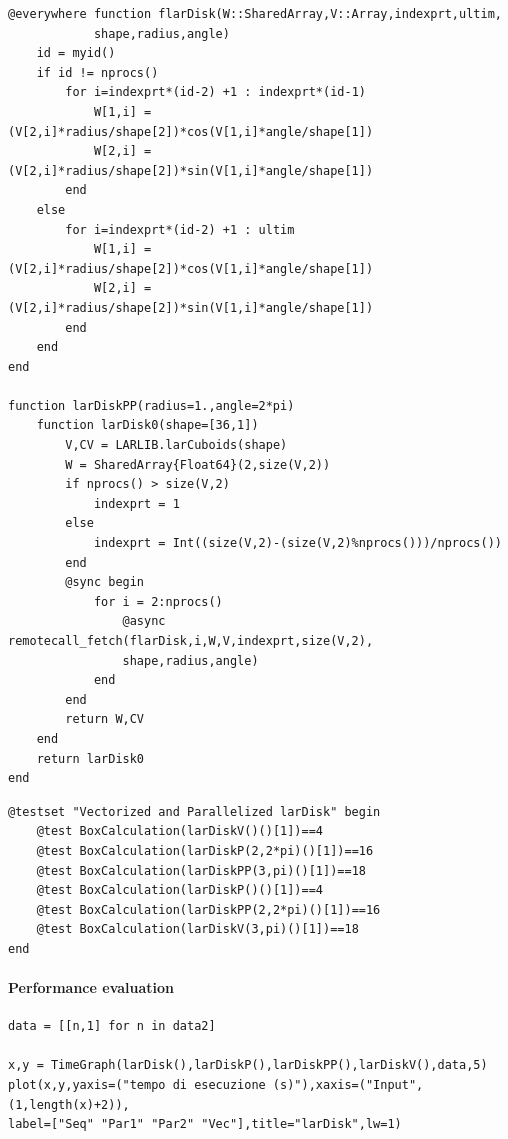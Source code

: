 \documentclass{article}
\begin{document}
\begin{Verbatim}
@everywhere function flarDisk(W::SharedArray,V::Array,indexprt,ultim,
            shape,radius,angle)
    id = myid()
    if id != nprocs()
        for i=indexprt*(id-2) +1 : indexprt*(id-1)
            W[1,i] = (V[2,i]*radius/shape[2])*cos(V[1,i]*angle/shape[1])
            W[2,i] = (V[2,i]*radius/shape[2])*sin(V[1,i]*angle/shape[1])  
        end
    else
        for i=indexprt*(id-2) +1 : ultim
            W[1,i] = (V[2,i]*radius/shape[2])*cos(V[1,i]*angle/shape[1])
            W[2,i] = (V[2,i]*radius/shape[2])*sin(V[1,i]*angle/shape[1])
        end
    end
end

function larDiskPP(radius=1.,angle=2*pi)
    function larDisk0(shape=[36,1])
        V,CV = LARLIB.larCuboids(shape)
        W = SharedArray{Float64}(2,size(V,2))
        if nprocs() > size(V,2)
            indexprt = 1
        else
            indexprt = Int((size(V,2)-(size(V,2)%nprocs()))/nprocs())
        end
        @sync begin
            for i = 2:nprocs()
                @async remotecall_fetch(flarDisk,i,W,V,indexprt,size(V,2),
                shape,radius,angle)
            end
        end
        return W,CV
    end
    return larDisk0    
end
\end{Verbatim}

\begin{Verbatim}
@testset "Vectorized and Parallelized larDisk" begin
    @test BoxCalculation(larDiskV()()[1])==4
    @test BoxCalculation(larDiskP(2,2*pi)()[1])==16
    @test BoxCalculation(larDiskPP(3,pi)()[1])==18
    @test BoxCalculation(larDiskP()()[1])==4
    @test BoxCalculation(larDiskPP(2,2*pi)()[1])==16
    @test BoxCalculation(larDiskV(3,pi)()[1])==18 
end
\end{Verbatim}

\paragraph{Performance evaluation}

\begin{Verbatim}
data = [[n,1] for n in data2]

x,y = TimeGraph(larDisk(),larDiskP(),larDiskPP(),larDiskV(),data,5)
plot(x,y,yaxis=("tempo di esecuzione (s)"),xaxis=("Input",(1,length(x)+2)),
label=["Seq" "Par1" "Par2" "Vec"],title="larDisk",lw=1)

\end{Verbatim}
\end{document}

